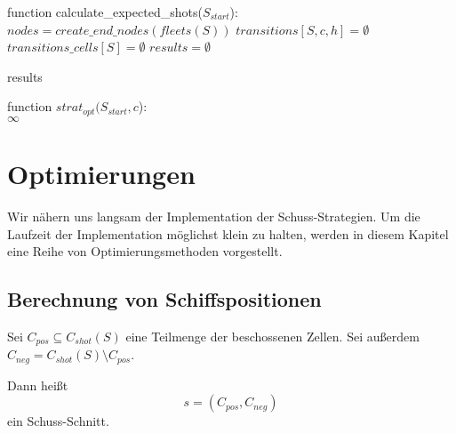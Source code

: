 \documentclass[a4paper,12pt]{llncs}
\numberwithin{equation}{section}
\begin{document}
\newpage

\begin{algorithm}[H]
 function calculate\_expected\_shots($S_{start}$):\\
 $nodes=create\_end\_nodes(fleets(S))$\;
 $transitions[S,c,h]=\emptyset$\;
 $transitions\_cells[S]=\emptyset$\;
 $results = \emptyset$\;

  \Return results\;
\end{algorithm}


\begin{algorithm}[H]
 function $strat_{opt}(S_{start}, c$):\\
   \Return $\infty$ \;
\end{algorithm}






\newpage

\section{Optimierungen}

Wir nähern uns langsam der Implementation der Schuss-Strategien.
Um die Laufzeit der Implementation möglichst klein zu halten, werden in diesem Kapitel eine Reihe von Optimierungsmethoden vorgestellt.

\subsection{Berechnung von Schiffspositionen}
\begin{definition}
Sei $C_{pos} \subseteq C_{shot}(S)$ eine Teilmenge der beschossenen Zellen.
Sei außerdem $C_{neg}=C_{shot}(S) \setminus C_{pos}$.

Dann heißt
\[
s=(C_{pos}, C_{neg})
\]
ein Schuss-Schnitt.
\end{definition}
\end{document}
